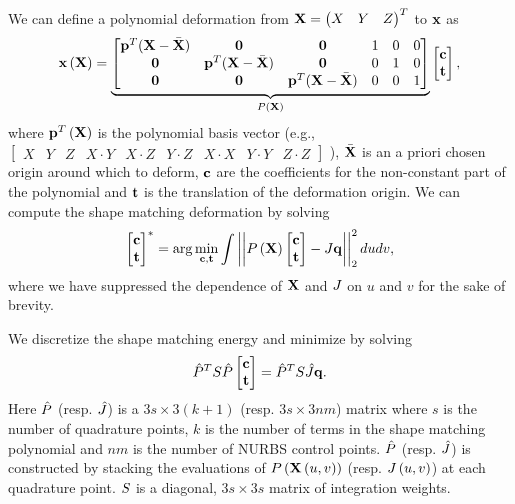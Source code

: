 We can define a polynomial deformation from $\mathbf{X} = \begin{pmatrix} X & Y & Z \end{pmatrix}^T$ to $\mathbf{x}$  as 
\begin{equation}
    \mathbf{x}\left(\mathbf{X}\right) = 
    \underbrace{\begin{bmatrix}
    \mathbf{p}^T(\mathbf{X}-\bar{\mathbf{X}}) & \mathbf{0} & \mathbf{0} & 1 & 0 & 0\\
    \mathbf{0} & \mathbf{p}^T(\mathbf{X}-\bar{\mathbf{X}}) & \mathbf{0} & 0 & 1 & 0\\
    \mathbf{0} & \mathbf{0} & \mathbf{p}^T(\mathbf{X}-\bar{\mathbf{X}}) & 0 & 0 & 1\\
    \end{bmatrix}}_{P\left(\mathbf{X}\right)}
    \begin{bmatrix} \mathbf{c}\\ \mathbf{t} \end{bmatrix},
    \label{eq:projection}
\end{equation} where $\mathbf{p}^T\left(\mathbf{X}\right)$ is the polynomial basis vector \newline (e.g., $\begin{bmatrix} X & Y & Z & X\cdot Y & X\cdot Z & Y\cdot Z& X\cdot X & Y\cdot Y & Z\cdot Z \end{bmatrix}$ ),
$\bar{\mathbf{X}}$ is an a priori chosen origin around which to deform, $\mathbf{c}$ are the coefficients for the 
non-constant part of the polynomial and $\mathbf{t}$ is the translation of the deformation origin. 
We can compute the shape matching deformation by solving~\cite{10.1145/1073204.1073216}
\begin{equation}
   \begin{bmatrix} \mathbf{c}\\ \mathbf{t} \end{bmatrix}^* = \arg\min_{\mathbf{c},\mathbf{t}} \int \left\lvert\left\lvert P\left(\mathbf{X}\right)\begin{bmatrix} \mathbf{c}\\ \mathbf{t} \end{bmatrix} - J\mathbf{q}\right\rvert\right\rvert^2_2 dudv,
\end{equation} where we have suppressed the dependence of $\mathbf{X}$ and $J$ on $u$ and $v$ for the sake of brevity.

We discretize the shape matching energy and minimize by solving
\begin{equation}
\hat{P}^TS\hat{P}\begin{bmatrix} \mathbf{c}\\ \mathbf{t} \end{bmatrix} = \hat{P}^TS\hat{J}\mathbf{q}.
\label{eq:shapematch}
\end{equation} Here $\hat{P}$ (resp. $\hat{J}$) is a $3s \times 3(k+1)$ (resp. $3s \times 3nm$) matrix where $s$ is the number of quadrature points, 
$k$ is the number of  terms in the shape matching polynomial and $nm$ is the number of NURBS control points. 
$\hat{P}$ (resp. $\hat{J}$) is constructed by stacking the evaluations of $P\left(\mathbf{X}\left(u,v\right)\right)$ (resp. $J\left(u, v\right)$) at each
quadrature point.
$S$ is a diagonal, $3s \times 3s$ matrix of integration weights.

